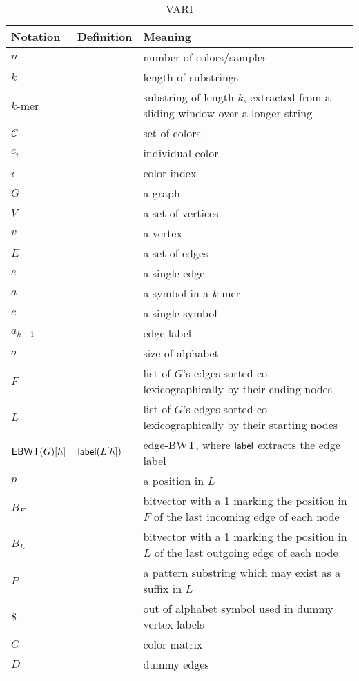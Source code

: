 \documentclass{article}
\begin{document}
\begin{table}
  \begin{tabularx}{\textwidth}{|l|X|X|}
    \hline
    Notation & Definition  & Meaning \\ \hline
    \hline
    \hline

    $n$ & & number of colors/samples \\ \hline
    $k$ & & length of substrings \\ \hline
    $k$-mer & & substring of length $k$, extracted from a sliding window over a longer string\\ \hline
    $\mathcal{C}$ & & set of colors \\ \hline
    $c_i$ & & individual color \\ \hline
    $i$ & & color index \\ \hline
    

    $G$ & & a graph \\ \hline
    $V$ & & a set of vertices \\ \hline
    $v$ & & a vertex \\ \hline
    $E$ & & a set of edges \\ \hline
    $e$ & & a single edge \\ \hline
    $a$ & & a symbol in a $k$-mer \\ \hline
    $c$ & & a single symbol \\ \hline
    $a_{k - 1}$ & & edge label \\ \hline
    $\sigma$ & & size of alphabet \\ \hline
    $F$ & & list of $G$'s edges sorted co-lexicographically by their ending nodes \\ \hline
    $L$ & & list of $G$'s edges sorted co-lexicographically by their starting nodes \\ \hline
    $\mathsf{EBWT} (G) [h]$ & $\mathsf{label} (L [h])$ & edge-BWT, where $\mathsf{label} $ extracts the edge label \\ \hline
    $p$ & & a position in $L$ \\ \hline
    $B_F$ & &  bitvector with a 1 marking the position in $F$ of the last incoming edge of each node \\ \hline
    $B_L$ & & bitvector with a 1 marking the position in $L$ of the last outgoing edge of each node \\ \hline
    $P$ & & a pattern substring which may exist as a suffix in $L$ \\ \hline
    $\$$ & & out of alphabet symbol used in dummy vertex labels \\ \hline
    $C$ & & color matrix \\ \hline
    $D$ & & dummy edges \\ \hline
    \hline    
  \end{tabularx}
  \caption{VARI}
\end{table}
\end{document}
